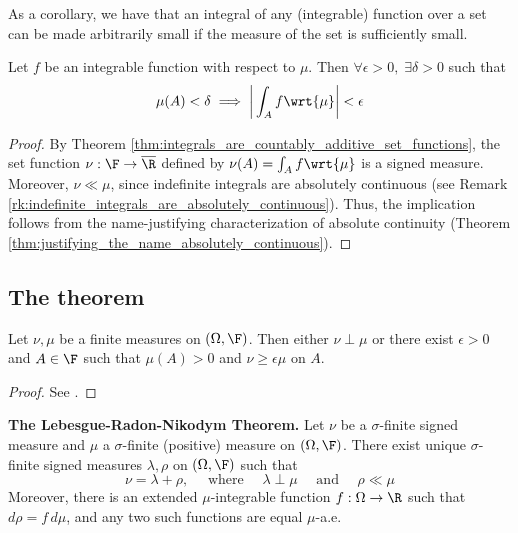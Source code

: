 \documentclass{article} %
\begin{document}
As a corollary, we have that an integral of any (integrable) function over a set can be made arbitrarily small if the measure of the set is sufficiently small.

\begin{corollary}
Let $f$ be an integrable function with respect to $\mu$. Then $\forall \epsilon > 0, \; \exists \delta > 0$ such that 
\[  \mu(A) < \delta \implies \bigg| \int_A f \wrt{\mu} \bigg| < \epsilon \]	
\end{corollary}

\begin{proof}
By Theorem \ref{thm:integrals_are_countably_additive_set_functions}, the set function $\nu : \F \to \overline{\R}$ defined by $\nu(A) = \int_A f \wrt{\mu}$ is a signed measure.    Moreover, $\nu \ll \mu$, since indefinite integrals are absolutely continuous (see Remark \ref{rk:indefinite_integrals_are_absolutely_continuous}).  Thus, the implication follows from the name-justifying characterization of absolute continuity (Theorem \ref{thm:justifying_the_name_absolutely_continuous}). 
\end{proof}

\subsection{The theorem}

\begin{lemma}
Let $\nu, \mu$ be a finite  measures on $(\Omega, \F)$.  Then either $\nu \perp \mu$ or there exist $\epsilon > 0$ and $A \in \F$ such that $\mu(A) > 0$ and $\nu \geq \epsilon \mu$ on $A$.
\label{lemma:lemma_for_lebesgue_radon_nikodym}
\end{lemma}

\begin{proof}
See \cite[pp.~89]{folland1999real}.
\end{proof}


\begin{theorem}{\textbf{The Lebesgue-Radon-Nikodym Theorem.}} Let $\nu$ be a $\sigma$-finite signed measure and $\mu$ a $\sigma$-finite (positive) measure on $(\Omega, \F)$.  There exist unique $\sigma$-finite signed measures $\lambda, \rho$ on $(\Omega, \F)$ such that
\[ \nu = \lambda + \rho, \quad \text{ where } \quad \lambda \perp \mu \quad \text{ and } \quad \rho \ll \mu\]
Moreover, there is an extended $\mu$-integrable function $f : \Omega \to \R$ such that $d\rho = f \, d\mu$, and any two such functions are equal $\mu$-a.e.
\label{thm:lebesgue_radon_nikodym}
\end{theorem}
\end{document}
